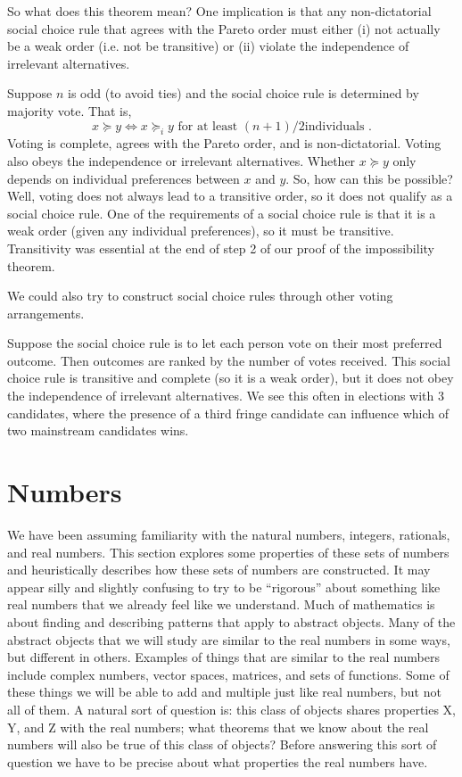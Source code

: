 So what does this theorem mean? One implication is that any
non-dictatorial social choice rule that agrees with the Pareto order
must either (i) not actually be a weak order (i.e. not be transitive)
or (ii) violate the independence of irrelevant alternatives.
\begin{example}
  Suppose $n$ is odd (to avoid ties) and the social choice rule is
  determined by majority vote. That is, 
  \[ x \succeq y \iff x \succeq_i y \text{ for at least $(n+1)/2$
    individuals }. \]
  Voting is complete, agrees with the Pareto order, and is
  non-dictatorial. Voting also obeys the independence or irrelevant
  alternatives. Whether $x \succeq y$ only depends on individual
  preferences between $x$ and $y$. So, how can this be possible? Well,
  voting does not always lead to a transitive order, so it does not
  qualify as a social choice rule.  One of the
  requirements of a social choice rule is that it is a weak order
  (given any individual preferences), so it
  must be transitive. Transitivity was essential at the end of step 2
  of our proof of the impossibility theorem.  
\end{example}
We could also try to construct social choice rules through other
voting arrangements. 
\begin{example}
  Suppose the social choice rule is to let each person vote on their
  most preferred outcome. Then outcomes are ranked by the number of
  votes received. This social choice rule is transitive and complete
  (so it is a weak order), but it does not obey the independence of
  irrelevant alternatives. We see this often in elections with 3
  candidates, where the presence of a third fringe candidate can
  influence which of two mainstream candidates wins.
\end{example}



\appendix
\section{Numbers \label{s:numbers}}

We have been assuming familiarity with the natural numbers, integers,
rationals, and real numbers. This section explores some properties of
these sets of numbers and heuristically describes how these sets of
numbers are constructed. It may appear silly and slightly confusing to
try to be ``rigorous'' about something like real numbers that we
already feel like we understand.  Much of mathematics is about finding
and describing patterns that apply to abstract objects. Many of the
abstract objects that we will study are similar to the real numbers in
some ways, but different in others. Examples of things that are
similar to the real numbers include complex numbers, vector spaces,
matrices, and sets of functions. Some of these things we will be able
to add and multiple just like real numbers, but not all of them. A
natural sort of question is: this class of objects shares properties
X, Y, and Z with the real numbers; what theorems that we know about
the real numbers will also be true of this class of objects? Before
answering this sort of question we have to be precise about what
properties the real numbers have.


